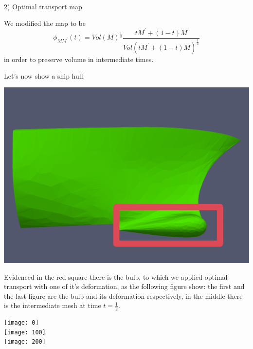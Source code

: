 \documentclass[b0paper,portrait]{baposter}
\begin{document}
\begin{poster}
\begin{posterbox}[name=otm,below=introduction,span=6,column=0]{2) Optimal transport map}
\begin{minipage}{0.48\textwidth}
We modified the map to be  $$\phi_{MM^{\prime}} (t)= {Vol(M)}^{\frac{1}{3}}\frac{tM^{\prime}+(1-t)M}{Vol(tM^{\prime}+(1-t)M)^{\frac{1}{3}}}$$
in order to preserve volume in intermediate times.\\
\end{minipage}
\hspace{.2cm}
\begin{minipage}{0.46\textwidth}
Let's now show a ship hull.\\
\begin{center}
\includegraphics[scale=0.08]{ship} 
\end{center}
Evidenced in the red square there is the bulb, to which we applied optimal transport with one of it's deformation, as the following figure show: the first and the last figure are the bulb and its deformation respectively, in the middle there is the intermediate mesh at time $t=\frac{1}{2}$.
\begin{center}
\texttt{[image: 0]} \\
\texttt{[image: 100]}\\
\texttt{[image: 200]}\\
\end{center}
\end{minipage}
\end{posterbox}


\end{poster}
\end{document}
